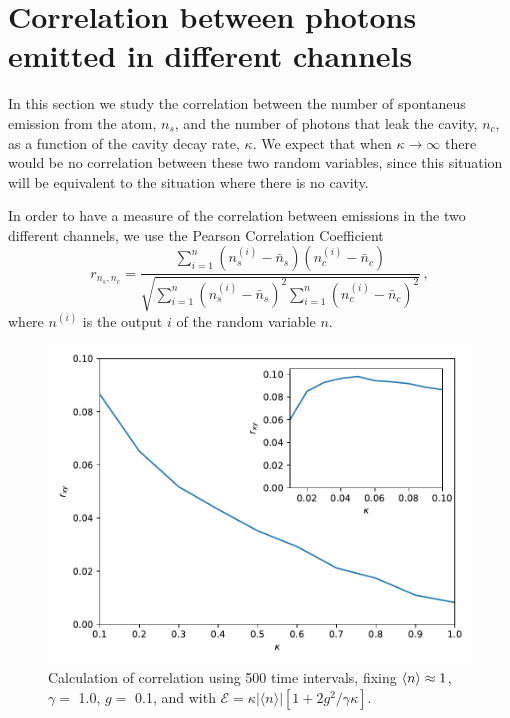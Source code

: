 \documentclass[conference]{IEEEtran}
\begin{document}
\section{Correlation between photons emitted in different channels}\label{sc:correlation}
In this section we study the correlation between the number of
spontaneus emission from the atom, $n_s$, and the number of photons
that leak the cavity, $n_c$, as a function of the cavity decay rate,
$\kappa$. We expect that when $\kappa\rightarrow\infty$ there would be
no correlation between these two random variables, since this
situation will be equivalent to the situation where there is no
cavity.

In order to have a measure of the correlation between emissions in the
two different channels, we use the Pearson Correlation Coefficient
\cite{benesty2009pearson}
\begin{equation} 
r_{n_s,n_c} = \frac{\sum\limits_{i=1}^n(n_s^{(i)} -
  \bar{n}_s)(n_c^{(i)} - \bar{n}_c)}{\sqrt{\sum\limits_{i=1}^n(n_s^{(i)}
    - \bar{n}_s)^2\sum\limits_{i=1}^n(n_c^{(i)} - \bar{n}_c)^2}}\, ,  \label{correlationc}
\end{equation}
where $n^{(i)}$ is the output $i$ of the random variable $n$.

\begin{center}
\begin{figure}[t!]
\begin{center}
\includegraphics[scale = 0.45]{million1.pdf}
\caption{\small{Calculation of correlation using 500 time intervals, fixing $\expval{n} \approx 1$, $\gamma =$ 1.0, $g = $ 0.1, and with  $\mathcal{E} =  \kappa |\langle n \rangle|[1 + 2g^2/\gamma \kappa]$.}} \label{corrxy}
\end{center}  
\end{figure}
\end{center}
\end{document}

